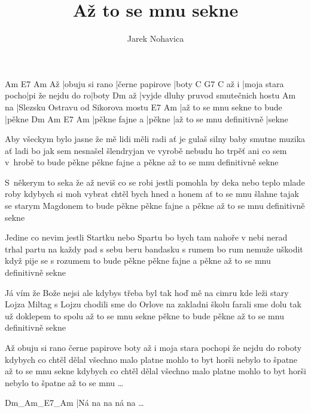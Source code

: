\documentclass{song}
\title{Až to se mnu sekne}
\author{Jarek Nohavica}
\begin{document}
\strophe
   Am             E7              Am
Až |obuju si rano |černe papirove |boty
     C                G7                C
až i |moja stara pocho|pi že nejdu do ro|boty
   Dm
až |vyjde dluhy pruvod smutečnich hostu
   Am
na |Slezsku Ostravu od Sikorova mostu
E7                          Am
|až to se mnu sekne to bude |pěkne
Dm             Am     E7                        Am
|pěkne fajne a |pěkne |až to se mnu definitivně |sekne
\endstrophe

\strophe*
Aby všeckym bylo jasne že mě lidi měli radi
ať je gulaš silny baby smutne muzika ať ladi
bo jak sem nesnašel šlendryjan ve vyrobě
nebudu ho trpěť ani co sem v~hrobě to bude pěkne
pěkne fajne a pěkne až to se mnu definitivně sekne
\endstrophe

\strophe*
S~někerym to seka že až neviš co se robi
jestli pomohla by deka nebo teplo mlade roby
kdybych si moh vybrat chtěl bych hned a honem
ať to se mnu šlahne tajak se starym Magdonem to bude pěkne
pěkne fajne a pěkne až to se mnu definitivně sekne
\endstrophe

\strophe*
Jedine co nevim jestli Startku nebo Spartu
bo bych tam nahoře v nebi nerad trhal partu
na každy pad s sebu beru bandasku s rumem
bo rum nemuže uškodit když pije se s rozumem to bude pěkne
pěkne fajne a pěkne až to se mnu definitivně sekne
\endstrophe

\strophe*
Já vím že Bože nejsi ale kdybys třeba byl tak
hoď mě na cimru kde leži stary Lojza Miltag
s Lojzu chodili sme do Orlove na zakladni školu
farali sme dolu tak už doklepem to spolu až to se mnu sekne
pěkne to bude pěkne až to se mnu definitivně sekne
\endstrophe

\strophe*
Až obuju si rano černe papirove boty
až i moja stara pochopi že nejdu do roboty
kdybych co chtěl dělal všechno malo platne
mohlo to byt horši nebylo to špatne až to se mnu sekne
kdybych co chtěl dělal všechno malo platne
mohlo to byt horši nebylo to špatne až to se mnu \ldots
\endstrophe

\strophe
Dm_Am_E7_Am
|Ná na na ná na \ldots
\endstrophe
\end{document}
